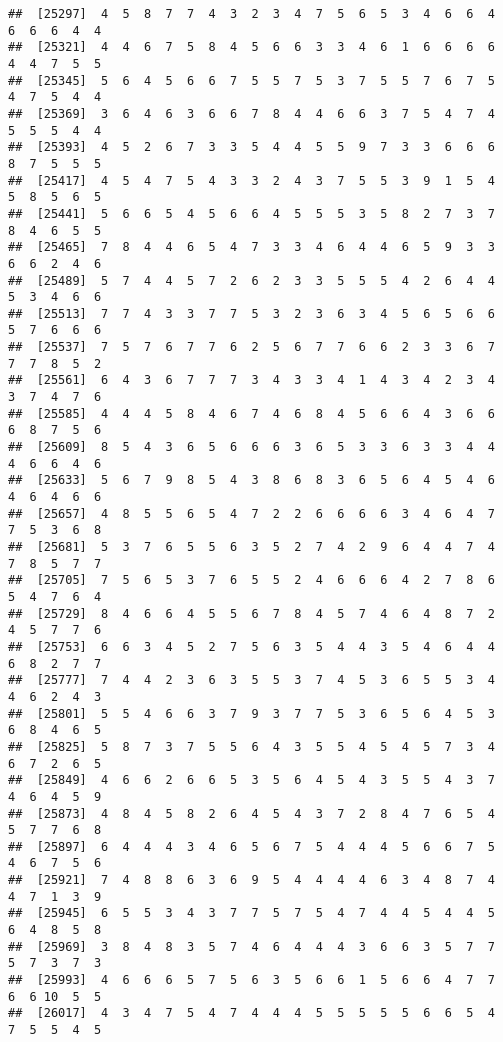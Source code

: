 \documentclass[
]{book}
\begin{document}
\begin{verbatim}
##  [25297]  4  5  8  7  7  4  3  2  3  4  7  5  6  5  3  4  6  6  4  6  6  6  4  4
##  [25321]  4  4  6  7  5  8  4  5  6  6  3  3  4  6  1  6  6  6  6  4  4  7  5  5
##  [25345]  5  6  4  5  6  6  7  5  5  7  5  3  7  5  5  7  6  7  5  4  7  5  4  4
##  [25369]  3  6  4  6  3  6  6  7  8  4  4  6  6  3  7  5  4  7  4  5  5  5  4  4
##  [25393]  4  5  2  6  7  3  3  5  4  4  5  5  9  7  3  3  6  6  6  8  7  5  5  5
##  [25417]  4  5  4  7  5  4  3  3  2  4  3  7  5  5  3  9  1  5  4  5  8  5  6  5
##  [25441]  5  6  6  5  4  5  6  6  4  5  5  5  3  5  8  2  7  3  7  8  4  6  5  5
##  [25465]  7  8  4  4  6  5  4  7  3  3  4  6  4  4  6  5  9  3  3  6  6  2  4  6
##  [25489]  5  7  4  4  5  7  2  6  2  3  3  5  5  5  4  2  6  4  4  5  3  4  6  6
##  [25513]  7  7  4  3  3  7  7  5  3  2  3  6  3  4  5  6  5  6  6  5  7  6  6  6
##  [25537]  7  5  7  6  7  7  6  2  5  6  7  7  6  6  2  3  3  6  7  7  7  8  5  2
##  [25561]  6  4  3  6  7  7  7  3  4  3  3  4  1  4  3  4  2  3  4  3  7  4  7  6
##  [25585]  4  4  4  5  8  4  6  7  4  6  8  4  5  6  6  4  3  6  6  6  8  7  5  6
##  [25609]  8  5  4  3  6  5  6  6  6  3  6  5  3  3  6  3  3  4  4  4  6  6  4  6
##  [25633]  5  6  7  9  8  5  4  3  8  6  8  3  6  5  6  4  5  4  6  4  6  4  6  6
##  [25657]  4  8  5  5  6  5  4  7  2  2  6  6  6  6  3  4  6  4  7  7  5  3  6  8
##  [25681]  5  3  7  6  5  5  6  3  5  2  7  4  2  9  6  4  4  7  4  7  8  5  7  7
##  [25705]  7  5  6  5  3  7  6  5  5  2  4  6  6  6  4  2  7  8  6  5  4  7  6  4
##  [25729]  8  4  6  6  4  5  5  6  7  8  4  5  7  4  6  4  8  7  2  4  5  7  7  6
##  [25753]  6  6  3  4  5  2  7  5  6  3  5  4  4  3  5  4  6  4  4  6  8  2  7  7
##  [25777]  7  4  4  2  3  6  3  5  5  3  7  4  5  3  6  5  5  3  4  4  6  2  4  3
##  [25801]  5  5  4  6  6  3  7  9  3  7  7  5  3  6  5  6  4  5  3  6  8  4  6  5
##  [25825]  5  8  7  3  7  5  5  6  4  3  5  5  4  5  4  5  7  3  4  6  7  2  6  5
##  [25849]  4  6  6  2  6  6  5  3  5  6  4  5  4  3  5  5  4  3  7  4  6  4  5  9
##  [25873]  4  8  4  5  8  2  6  4  5  4  3  7  2  8  4  7  6  5  4  5  7  7  6  8
##  [25897]  6  4  4  4  3  4  6  5  6  7  5  4  4  4  5  6  6  7  5  4  6  7  5  6
##  [25921]  7  4  8  8  6  3  6  9  5  4  4  4  4  6  3  4  8  7  4  4  7  1  3  9
##  [25945]  6  5  5  3  4  3  7  7  5  7  5  4  7  4  4  5  4  4  5  6  4  8  5  8
##  [25969]  3  8  4  8  3  5  7  4  6  4  4  4  3  6  6  3  5  7  7  5  7  3  7  3
##  [25993]  4  6  6  6  5  7  5  6  3  5  6  6  1  5  6  6  4  7  7  6  6 10  5  5
##  [26017]  4  3  4  7  5  4  7  4  4  4  5  5  5  5  5  6  6  5  4  7  5  5  4  5

\end{verbatim}
\end{document}
